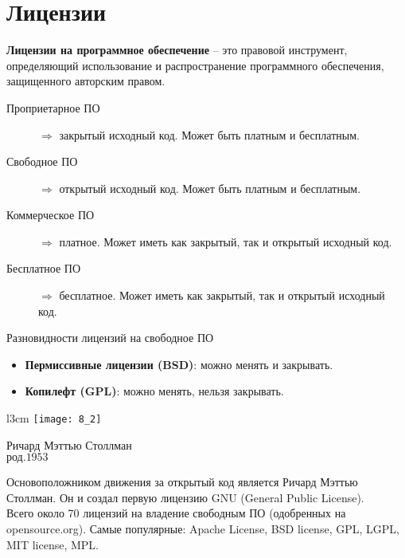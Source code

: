 \section{Лицензии}
\textbf{Лицензии на программное обеспечение} – это правовой инструмент, определяющий использование и распространение программного
обеспечения, защищенного авторским правом.
\begin{description}
  \item[Проприетарное ПО] $\Rightarrow$ закрытый исходный код. Может быть платным и бесплатным.
  \item[Свободное ПО] $\Rightarrow$ открытый исходный код. Может быть платным и бесплатным.
  \item[Коммерческое ПО ] $\Rightarrow$ платное. Может иметь как закрытый, так и открытый исходный код.
  \item[Бесплатное ПО] $\Rightarrow$ бесплатное. Может иметь как закрытый, так и открытый исходный код.
\end{description}
\begin{center}
Разновидности лицензий на свободное ПО
\end{center}
\begin{itemize}
  \item\textbf{Пермиссивные лицензии (BSD)}: можно менять и закрывать.
  \item\textbf{Копилефт (GPL)}: можно менять, нельзя закрывать.
\end{itemize}

\begin{wrapfigure}[12]{l}{3cm}
\texttt{[image: 8\_2]}
\begin{center}
\footnotesize{Ричард Мэттью Столлман}
\\\footnotesize{$\mbox{род.} 1953$}
\end{center}
\end{wrapfigure}
Основоположником движения за открытый код является Ричард Мэттью Столлман. Он и создал первую лицензию GNU (General Public License).
\\Всего около 70 лицензий на владение свободным ПО (одобренных на opensource.org). Самые популярные: Apache License, BSD license, GPL, LGPL, MIT license, MPL.
